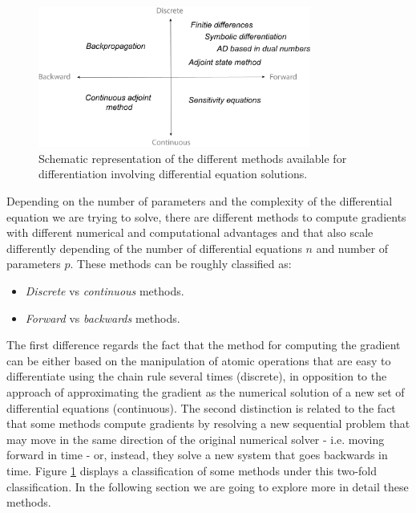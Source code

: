 \begin{figure}[]
    \centering
    \includegraphics[width=0.80\textwidth]{figures/scheme-methods.png}
    \caption{Schematic representation of the different methods available for differentiation involving differential equation solutions.}
    \label{fig:diff}
\end{figure}
Depending on the number of parameters and the complexity of the differential equation we are trying to solve, there are different methods to compute gradients with different numerical and computational advantages and that also scale differently depending of the number of differential equations $n$ and number of parameters $p$.
These methods can be roughly classified as:
\begin{itemize}
    \item \textit{Discrete} vs \textit{continuous} methods.
    \item \textit{Forward} vs \textit{backwards} methods.
\end{itemize}
The first difference regards the fact that the method for computing the gradient can be either based on the manipulation of atomic operations that are easy to differentiate using the chain rule several times (discrete), in opposition to the approach of approximating the gradient as the numerical solution of a new set of differential equations (continuous).
The second distinction is related to the fact that some methods compute gradients by resolving a new sequential problem that may move in the same direction of the original numerical solver - i.e. moving forward in time - or, instead, they solve a new system that goes backwards in time. 
Figure \ref{fig:diff} displays a classification of some methods under this two-fold classification. In the following section we are going to explore more in detail these methods.